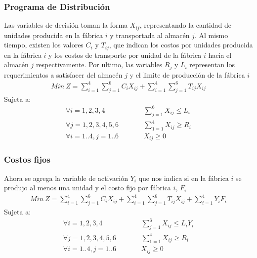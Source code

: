 
\pagebreak
\begin{homeworkProblem}
\subsubsection{Programa de Distribución}
Las variables de decisión toman la forma $X_{ij}$, representando la cantidad de unidades producida en la fábrica $i$ y transportada al almacén $j$.
Al mismo tiempo, existen los valores $C_i$ y $T_{ij}$, que indican los costos por unidades producida en la fábrica $i$ y los costos de transporte por unidad de la fábrica $i$ hacia el almacén $j$ respectivamente. Por ultimo, las variables $R_j$ y $L_i$  representan los requerimientos a satisfacer del almacén $j$ y el limite de producción de la fábrica $i$
\begin{align*}
    Min\ Z = \sum_{i=1}^{4}{\sum_{j=1}^{6}{C_iX_{ij}}}   +
     \sum_{i=1}^{4}{\sum_{j=1}^{6}{T_{ij}X_{ij}}}
\end{align*}
Sujeta a:
\begin{align*}
    &\forall i=1,2,3,4&\quad\quad &\sum_{j=1}^{6}{X_{ij}}\leq L_i& \\
    &\forall j=1,2,3,4,5,6&\quad\quad &\sum_{1=1}^{4}{X_{ij}}\geq R_i& \\
    &\forall i=1..4,j=1..6&\quad\quad &X_{ij}\geq 0&
\end{align*}


\subsubsection{Costos fijos}
Ahora se agrega la variable de activación $Y_{i}$  que nos indica si en la fábrica $i$ se produjo al menos una unidad y el costo fijo por fábrica $i$, $F_i$
\begin{align*}
    Min\ Z = \sum_{i=1}^{4}{\sum_{j=1}^{6}{C_iX_{ij}}}   +
     \sum_{i=1}^{4}{\sum_{j=1}^{6}{T_{ij}X_{ij}}} + \sum_{i=1}^{4}{Y_iF_i}
\end{align*}
Sujeta a:
\begin{align*}
    &\forall i=1,2,3,4&\quad\quad &\sum_{j=1}^{6}{X_{ij}}\leq L_iY_i& \\
    &\forall j=1,2,3,4,5,6&\quad\quad &\sum_{1=1}^{4}{X_{ij}}\geq R_i& \\
    &\forall i=1..4,j=1..6&\quad\quad &X_{ij}\geq 0&
\end{align*}



\end{homeworkProblem}
